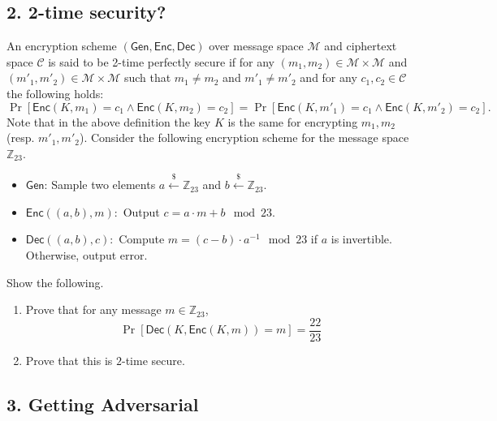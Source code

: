\documentclass[11pt]{article}
\newcommand{\Gen}{\mathsf{Gen}}
\newcommand{\Enc}{\mathsf{Enc}}
\newcommand{\Dec}{\mathsf{Dec}}
\newcommand{\Z}{\mathbb{Z}}
\newcommand{\getsr}{\stackrel{\$}{\gets}}
\begin{document}
\subsection*{2. 2-time security?}
An encryption scheme $(\Gen,\Enc,\Dec)$ over message space $\mathcal{M}$ and ciphertext space $\mathcal{C}$ is said to be 2-time perfectly secure if for any $(m_1,m_2) \in \mathcal{M} \times \mathcal{M}$ and $(m'_1,m'_2) \in \mathcal{M} \times \mathcal{M}$ such that $m_1 \neq m_2$ and $m'_1 \neq m'_2$ and for any $c_1,c_2 \in \mathcal{C}$ the following holds:
$$
\Pr[\Enc(K,m_1) = c_1 \wedge \Enc(K,m_2) = c_2] = \Pr[\Enc(K,m'_1) = c_1 \wedge \Enc(K,m'_2) = c_2].
$$
Note that in the above definition the key $K$ is the same for encrypting $m_1,m_2$ (resp. $m'_1,m'_2$).
Consider the following encryption scheme for the message space $\Z_{23}$.
\begin{itemize}
    \item $\Gen$: Sample two elements $a \getsr \Z_{23} $ and $b \getsr \Z_{23}$.
    \item $\Enc((a,b),m):$ Output $c = a\cdot m + b \mod 23$.
    \item $\Dec((a,b),c):$ Compute $m = (c - b) \cdot a^{-1} \mod 23$ if $a$ is invertible. Otherwise, output error.
\end{itemize}
Show the following.
\begin{enumerate}
    \item Prove that for any message $m \in \Z_{23}$, 
    $$
    \Pr[\Dec(K,\Enc(K,m)) = m] = \frac{22}{23}
    $$
    \item Prove that this is $2$-time secure.
\end{enumerate}

\subsection*{3. Getting Adversarial}
\end{document}

